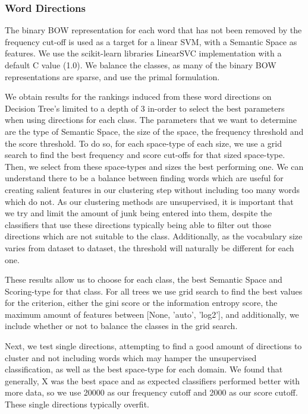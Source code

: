 \subsubsection{Word Directions}
The binary BOW representation for each word that has not been removed by the frequency cut-off is used as a target for a linear SVM, with a Semantic Space as features. We use the scikit-learn libraries LinearSVC implementation with a default C value (1.0). We balance the classes, as many of the binary BOW representations are sparse, and use the primal formulation. %

We obtain results for the rankings induced from these word directions on Decision Tree's limited to a depth of 3 in-order to select the best parameters when using directions for each class. The parameters that we want to determine are the type of Semantic Space, the size of the space, the frequency threshold and the score threshold. To do so, for each space-type of each size, we use a grid search to find the best frequency and score cut-offs for that sized space-type. Then, we select from these space-types and sizes the best performing one. We can understand there to be a balance between finding words which are useful for creating salient features in our clustering step without including too many words which do not. As our clustering methods are unsupervised, it is important that we try and limit the amount of junk being entered into them, despite the classifiers that use these directions typically being able to filter out those directions which are not suitable to the class. Additionally, as the vocabulary size varies from dataset to dataset, the threshold will naturally be different for each one. 

These results allow us to choose for each class, the best Semantic Space and Scoring-type for that class. For all trees we use grid search to find the best values for the criterion, either the gini score or the information entropy score, the maximum amount of features between [None, 'auto', 'log2'], and additionally, we include whether or not to balance the classes in the grid search.



Next, we test single directions, attempting to find a good amount of directions to cluster and not including words which may hamper the unsupervised classification, as well as the best space-type for each domain. We found that generally, X was the best space and as expected classifiers performed better with more data, so we use 20000 as our frequency cutoff and 2000 as our score cutoff. These single directions typically overfit.


